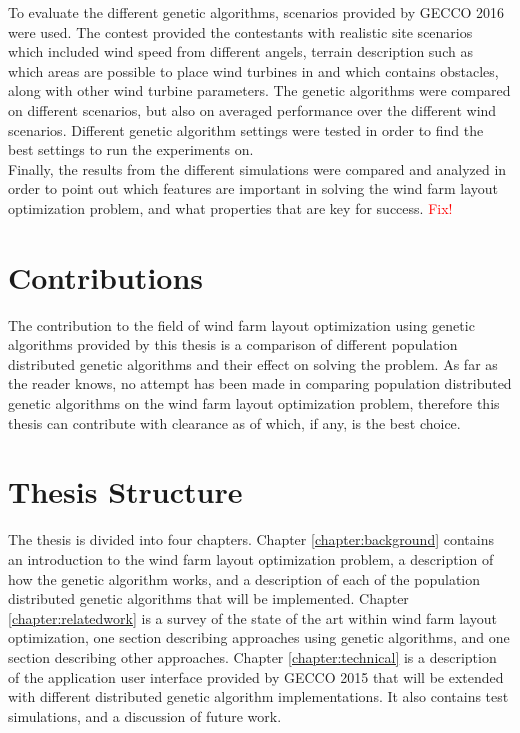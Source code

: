 \noindent To evaluate the different genetic algorithms, scenarios provided by GECCO 2016 were used. The contest provided the contestants with realistic site scenarios which included wind speed from different angels, terrain description such as which areas are possible to place wind turbines in and which contains obstacles, along with other wind turbine parameters. The genetic algorithms were compared on different scenarios, but also on averaged performance over the different wind scenarios. Different genetic algorithm settings were tested in order to find the best settings to run the experiments on.\\

\noindent Finally, the results from the different simulations were compared and analyzed in order to point out which features are important in solving the wind farm layout optimization problem, and what properties that are key for success. \textcolor{red}{Fix!}


\section{Contributions}\label{section:contributions}
The contribution to the field of wind farm layout optimization using genetic algorithms provided by this thesis is a comparison of different population distributed genetic algorithms and their effect on solving the problem. As far as the reader knows, no attempt has been made in comparing population distributed genetic algorithms on the wind farm layout optimization problem, therefore this thesis can contribute with clearance as of which, if any, is the best choice.


\section{Thesis Structure}\label{thesisstructure}
The thesis is divided into four chapters. Chapter \ref{chapter:background} contains an introduction to the wind farm layout optimization problem, a description of how the genetic algorithm works, and a description of each of the population distributed genetic algorithms that will be implemented. Chapter \ref{chapter:relatedwork} is a survey of the state of the art within wind farm layout optimization, one section describing approaches using genetic algorithms, and one section describing other approaches. Chapter \ref{chapter:technical} is a description of the application user interface provided by GECCO 2015 that will be extended with different distributed genetic algorithm implementations. It also contains test simulations, and a discussion of future work. 